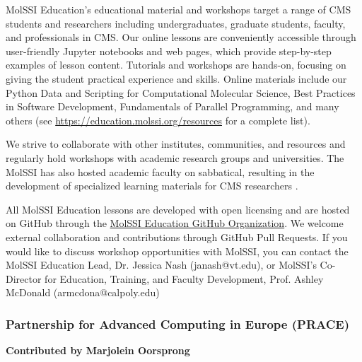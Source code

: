 \documentclass[9pt,review]{livecoms}
\begin{document}
MolSSI Education’s educational material and workshops target a range of CMS students and researchers including undergraduates, graduate students, faculty, and professionals in CMS. 
Our online lessons are conveniently accessible through user-friendly Jupyter notebooks and web pages, which provide step-by-step examples of lesson content. 
Tutorials and workshops are hands-on, focusing on giving the student practical experience and skills. 
Online materials include our Python Data and Scripting for Computational Molecular Science, Best Practices in Software Development, Fundamentals of Parallel Programming, and many others (see \href{https://education.molssi.org/resources}{https://education.molssi.org/resources} for a complete list). 

We strive to collaborate with other institutes, communities, and resources and regularly hold workshops with academic research groups and universities. The MolSSI has also hosted academic faculty on sabbatical, resulting in the development of specialized learning materials for CMS researchers \cite{Craig2022}.  

All MolSSI Education lessons are developed with open licensing and are hosted on GitHub through the \href{https://github.com/molssi-education}{MolSSI Education GitHub Organization}. We welcome external collaboration and contributions through GitHub Pull Requests. If you would like to discuss workshop opportunities with MolSSI, you can contact the MolSSI Education Lead, Dr. Jessica Nash (janash@vt.edu), or MolSSI's Co-Director for Education, Training, and Faculty Development, Prof. Ashley McDonald (armcdona@calpoly.edu)

 \subsubsection{Partnership for Advanced Computing in Europe (PRACE)}

\textbf{Contributed by Marjolein Oorsprong}
\end{document}
